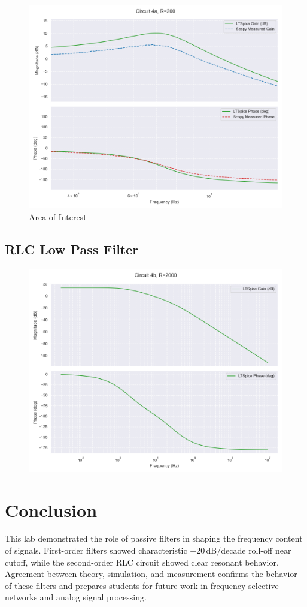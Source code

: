 \documentclass[12pt]{article}
\begin{document}
\begin{figure}[H]
	\includegraphics[width=\textwidth]{e6_bandbode}
	\caption{Area of Interest}
\end{figure}
\subsection{RLC Low Pass Filter}
\begin{figure}[H]
	\includegraphics[width=\textwidth]{e6_bode5}
\end{figure}
\section{Conclusion}
This lab demonstrated the role of passive filters in shaping the frequency content of signals. First-order filters showed characteristic $-20\,\mathrm{dB/decade}$ roll-off near cutoff, while the second-order RLC circuit showed clear resonant behavior. Agreement between theory, simulation, and measurement confirms the behavior of these filters and prepares students for future work in frequency-selective networks and analog signal processing.
\end{document}
